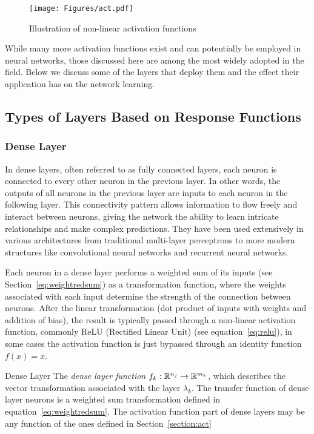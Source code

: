 \begin{figure}[ht!]
	\begin{center}
		\texttt{[image: Figures/act.pdf]}
	\end{center}
	\caption{Illustration of non-linear activation functions}
	\label{Fig:act}
\end{figure} 



While many more activation functions exist and can potentially be employed in neural networks, those discussed here are among the most widely adopted in the field. Below we discuss some of the layers that deploy them and the effect their application has on the network learning. 

\subsection{Types of Layers Based on Response Functions}

\subsubsection{Dense Layer}
\label{section:dense}
In dense layers, often referred to as fully connected layers, each neuron is connected to every other neuron in the previous layer. In other words, the outputs of all neurons in the previous layer are inputs to each neuron in the following layer. This connectivity pattern allows information to flow freely and interact between neurons, giving the network the ability to learn intricate relationships and make complex predictions. They have been used extensively in various architectures from traditional multi-layer perceptrons to more modern structures like convolutional neural networks and recurrent neural networks.

Each neuron in a dense layer performs a weighted sum of its inputs (see Section~\ref{eq:weightredsum}) as a transformation function, where the weights associated with each input determine the strength of the connection between neurons. After the linear transformation (dot product of inputs with weights and addition of bias), the result is typically passed through a non-linear activation function, commonly ReLU (Rectified Linear Unit) (see equation~\eqref{eq:relu}), in some cases the activation function is just bypassed through an identity function $f(x) = x$.

\begin{Definition}{Dense Layer}{}
The \emph{dense layer function} $f_k:\mathbb{R}^{n_j}\to \mathbb{R}^{m_k}$, which describes the vector transformation associated with the layer $\lambda_k$. The transfer function of dense layer neurons is a weighted sum transformation defined in equation~\eqref{eq:weightredsum}. The activation function part of dense layers may be any function of the ones defined in Section~\ref{section:act}
\end{Definition}

